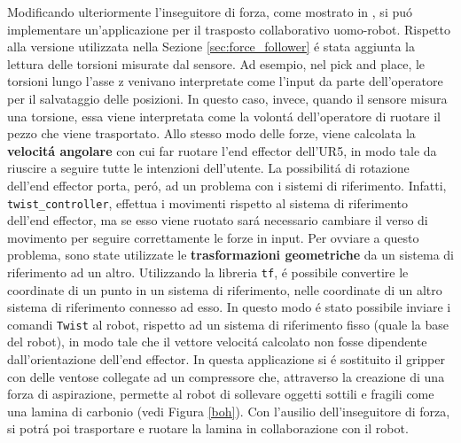 Modificando ulteriormente l'inseguitore di forza, come mostrato in \cite{full_force_follower}, si pu\'{o} implementare un'applicazione 
per il trasposto collaborativo uomo-robot. Rispetto alla versione utilizzata nella Sezione \ref{sec:force_follower} \'{e} stata aggiunta 
la lettura delle torsioni misurate dal sensore. 
Ad esempio, nel pick and place, le torsioni lungo l'asse z venivano interpretate come l'input da parte dell'operatore per il salvataggio 
delle posizioni. In questo caso, invece, quando il sensore misura una torsione, essa viene interpretata come la volont\'{a} 
dell'operatore di ruotare il pezzo che viene trasportato.
Allo stesso modo delle forze, viene calcolata la \textbf{velocit\'{a} angolare} 
con cui far ruotare l'end effector dell'UR5, in modo tale da riuscire a seguire tutte le intenzioni dell'utente. 
La possibilit\'{a} di rotazione dell'end effector porta, per\'{o}, ad un problema con i sistemi di riferimento. 
Infatti, \verb|twist_controller|, effettua i movimenti rispetto al sistema di riferimento dell'end effector, ma se esso viene ruotato 
sar\'{a} necessario cambiare il verso di movimento per seguire correttamente le forze in input. Per ovviare a questo 
problema, sono state utilizzate le \textbf{trasformazioni geometriche} da un sistema di riferimento ad un altro. 
Utilizzando la libreria \verb|tf|, \'{e} possibile convertire le coordinate di un punto in un sistema di riferimento, nelle 
coordinate di un altro sistema di riferimento connesso ad esso. In questo modo \'{e} stato possibile inviare i comandi 
\verb|Twist| al robot, rispetto ad un sistema di riferimento fisso (quale la base del robot), in modo tale che il vettore velocit\'{a} 
calcolato non fosse dipendente dall'orientazione dell'end effector. 
In questa applicazione si \'{e} sostituito il gripper con delle ventose collegate ad un compressore che, attraverso la creazione di 
una forza di aspirazione, permette al robot di sollevare oggetti sottili e fragili come una lamina di carbonio (vedi Figura \ref{boh}). 
Con l'ausilio dell'inseguitore di forza, si potr\'{a} poi trasportare e ruotare la lamina in collaborazione con il robot.
